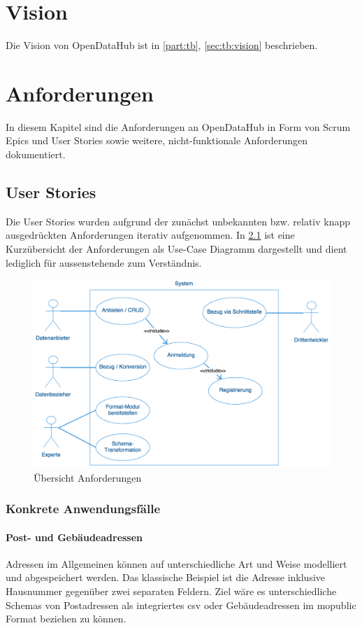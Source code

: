 \chapter{Vision}
Die Vision von OpenDataHub ist in \cref{part:tb}, \vref{sec:tb:vision} beschrieben.


\chapter{Anforderungen}
In diesem Kapitel sind die Anforderungen an OpenDataHub in Form von Scrum Epics und User Stories sowie weitere, nicht-funktionale Anforderungen dokumentiert.


\section{User Stories}\label{sec:pd:user-stories}

Die User Stories wurden aufgrund der zunächst unbekannten bzw. relativ knapp ausgedrückten Anforderungen iterativ aufgenommen. In \cref{fig:pd:uc-diagramm} ist eine Kurzübersicht der Anforderungen als Use-Case Diagramm dargestellt und dient lediglich für aussenstehende zum Verständnis.

\begin{figure}[H]
	\centering
	\includegraphics[width=0.9\linewidth]{fig/uc-diagramm}
	\caption{Übersicht Anforderungen}
	\label{fig:pd:uc-diagramm}
\end{figure}

\subsection{Konkrete Anwendungsfälle}
\label{sec:pd:usecases}

\subsubsection{Post- und Gebäudeadressen}
Adressen im Allgemeinen können auf unterschiedliche Art und Weise modelliert und abgespeichert werden. Das klassische Beispiel ist die Adresse inklusive Hausnummer gegenüber zwei separaten Feldern. Ziel wäre es unterschiedliche Schemas von Postadressen als integriertes \acs{csv} oder Gebäudeadressen im \gls{mopublic} Format beziehen zu können.

